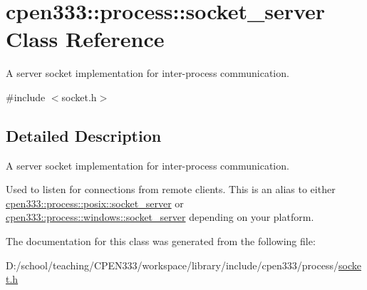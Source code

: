 \hypertarget{classcpen333_1_1process_1_1socket__server}{}\section{cpen333\+:\+:process\+:\+:socket\+\_\+server Class Reference}
\label{classcpen333_1_1process_1_1socket__server}


A server socket implementation for inter-\/process communication.  




{\ttfamily \#include $<$socket.\+h$>$}



\subsection{Detailed Description}
A server socket implementation for inter-\/process communication. 

Used to listen for connections from remote clients. This is an alias to either \hyperlink{classcpen333_1_1process_1_1posix_1_1socket__server}{cpen333\+::process\+::posix\+::socket\+\_\+server} or \hyperlink{classcpen333_1_1process_1_1windows_1_1socket__server}{cpen333\+::process\+::windows\+::socket\+\_\+server} depending on your platform. 

The documentation for this class was generated from the following file\+:\begin{DoxyCompactItemize}
\item 
D\+:/school/teaching/\+C\+P\+E\+N333/workspace/library/include/cpen333/process/\hyperlink{socket_8h}{socket.\+h}\end{DoxyCompactItemize}
